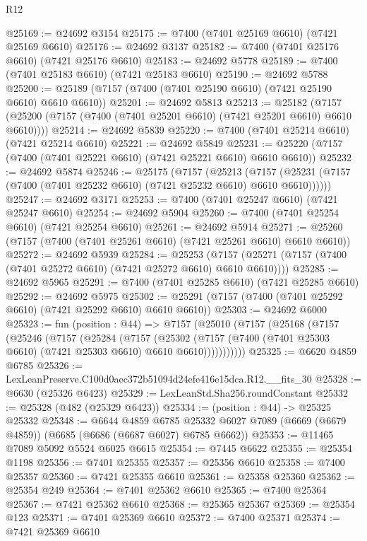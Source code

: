 \begin{lexlean}{R12}
\begin{coremodule}
@25169 := @24692 @3154
@25175 := @7400 (@7401 @25169 @6610) (@7421 @25169 @6610)
@25176 := @24692 @3137
@25182 := @7400 (@7401 @25176 @6610) (@7421 @25176 @6610)
@25183 := @24692 @5778
@25189 := @7400 (@7401 @25183 @6610) (@7421 @25183 @6610)
@25190 := @24692 @5788
@25200 := @25189 (@7157 (@7400 (@7401 @25190 @6610) (@7421 @25190 @6610) @6610 @6610))
@25201 := @24692 @5813
@25213 := @25182
    (@7157 (@25200 (@7157 (@7400 (@7401 @25201 @6610) (@7421 @25201 @6610) @6610 @6610))))
@25214 := @24692 @5839
@25220 := @7400 (@7401 @25214 @6610) (@7421 @25214 @6610)
@25221 := @24692 @5849
@25231 := @25220 (@7157 (@7400 (@7401 @25221 @6610) (@7421 @25221 @6610) @6610 @6610))
@25232 := @24692 @5874
@25246 := @25175
    (@7157
      (@25213
        (@7157 (@25231 (@7157 (@7400 (@7401 @25232 @6610) (@7421 @25232 @6610) @6610 @6610))))))
@25247 := @24692 @3171
@25253 := @7400 (@7401 @25247 @6610) (@7421 @25247 @6610)
@25254 := @24692 @5904
@25260 := @7400 (@7401 @25254 @6610) (@7421 @25254 @6610)
@25261 := @24692 @5914
@25271 := @25260 (@7157 (@7400 (@7401 @25261 @6610) (@7421 @25261 @6610) @6610 @6610))
@25272 := @24692 @5939
@25284 := @25253
    (@7157 (@25271 (@7157 (@7400 (@7401 @25272 @6610) (@7421 @25272 @6610) @6610 @6610))))
@25285 := @24692 @5965
@25291 := @7400 (@7401 @25285 @6610) (@7421 @25285 @6610)
@25292 := @24692 @5975
@25302 := @25291 (@7157 (@7400 (@7401 @25292 @6610) (@7421 @25292 @6610) @6610 @6610))
@25303 := @24692 @6000
@25323 := fun (position : @44) =>
  @7157
    (@25010
      (@7157
        (@25168
          (@7157
            (@25246
              (@7157
                (@25284
                  (@7157
                    (@25302
                      (@7157 (@7400 (@7401 @25303 @6610) (@7421 @25303 @6610) @6610 @6610)))))))))))
@25325 := @6620 @4859 @6785
@25326 := LexLeanPreserve.C100d0aec372b51094d24efe416e15dca.R12.__fits_30
@25328 := @6630 (@25326 @6423)
@25329 := LexLeanStd.Sha256.roundConstant
@25332 := @25328 (@482 (@25329 @6423))
@25334 := (position : @44) -> @25325 @25332
@25348 := @6644
    @4859
    @6785
    @25332
    @6027
    @7089
    (@6669 (@6679 @4859))
    (@6685 (@6686 (@6687 @6027) @6785 @6662))
@25353 := @11465 @7089 @5092 @5524 @6025 @6615
@25354 := @7445 @6622
@25355 := @25354 @1198
@25356 := @7401 @25355
@25357 := @25356 @6610
@25358 := @7400 @25357
@25360 := @7421 @25355 @6610
@25361 := @25358 @25360
@25362 := @25354 @249
@25364 := @7401 @25362 @6610
@25365 := @7400 @25364
@25367 := @7421 @25362 @6610
@25368 := @25365 @25367
@25369 := @25354 @123
@25371 := @7401 @25369 @6610
@25372 := @7400 @25371
@25374 := @7421 @25369 @6610

\end{coremodule}
\end{lexlean}
